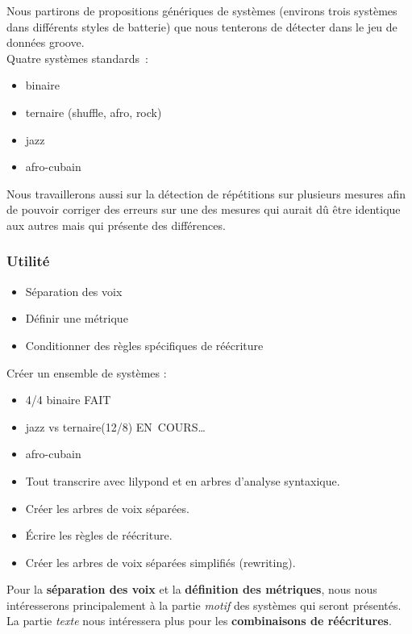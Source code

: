 Nous partirons de propositions génériques de systèmes (environs trois systèmes dans différents styles de batterie) que nous tenterons de détecter dans le jeu de données groove.\\

Quatre systèmes standards :
\begin{itemize}
	\item binaire
	\item ternaire (shuffle, afro, rock)
	\item jazz
	\item afro-cubain\\
\end{itemize}

Nous travaillerons aussi sur la détection de répétitions sur plusieurs mesures afin de pouvoir corriger des erreurs sur une des mesures qui aurait dû être identique aux autres mais qui présente des différences.

\subsubsection{Utilité}
\begin{itemize}
	\item Séparation des voix
	\item Définir une métrique
	\item Conditionner des règles spécifiques de réécriture
\end{itemize}

Créer un ensemble de systèmes :
\begin{itemize}
	\item 4/4 binaire FAIT
	\item jazz vs ternaire(12/8) EN COURS…
	\item afro-cubain
	\item Tout transcrire avec lilypond et en arbres d’analyse syntaxique.
	\item Créer les arbres de voix séparées.
	\item Écrire les règles de réécriture.
	\item Créer les arbres de voix séparées simplifiés (rewriting).\\	
\end{itemize}

Pour la \textbf{séparation des voix} et la \textbf{définition des métriques}, nous nous intéresserons principalement à la partie \textit{motif} des systèmes qui seront présentés. La partie \textit{texte} nous intéressera plus pour les \textbf{combinaisons de réécritures}.
\newpage

